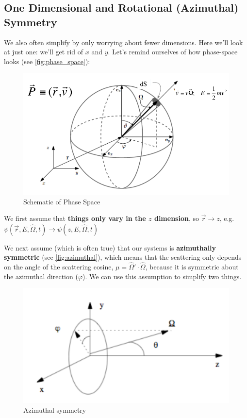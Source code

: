 \documentclass[12pt]{article}
\newcommand{\vOmega}{\ensuremath{\hat{\Omega}}}
\begin{document}
\subsection*{One Dimensional and Rotational (Azimuthal) Symmetry}
We also often simplify by only worrying about fewer dimensions. Here we'll look at just one: we'll get rid of $x$ and $y$. Let's remind ourselves of how phase-space looks (see \autoref{fig:phase_space}):
\begin{figure}[h!]
    \begin{center}
    \includegraphics[keepaspectratio, width = 4 in]{phase-space}
    \end{center}
    \caption{Schematic of Phase Space}
    \label{fig:phase_space}
\end{figure}

We first assume that \textbf{things only vary in the $z$ dimension}, so $\vec{r} \rightarrow z$, e.g.\\ $\psi(\vec{r}, E, \vOmega, t) \rightarrow \psi(z, E, \vOmega, t)$

We next assume (which is often true) that our systems is \textbf{azimuthally symmetric} (see \autoref{fig:azimuthal}), which means that the scattering only depends on the angle of the scattering cosine, $\mu =\vOmega' \cdot \vOmega$, because it is symmetric about the azimuthal direction ($\varphi$). We can use this assumption to simplify two things. 
\begin{figure}[h!]
    \begin{center}
    \includegraphics[keepaspectratio, width = 3 in]{azimuthal}
    \end{center}
    \caption{Azimuthal symmetry}
    \label{fig:azimuthal}
\end{figure}
\end{document}
